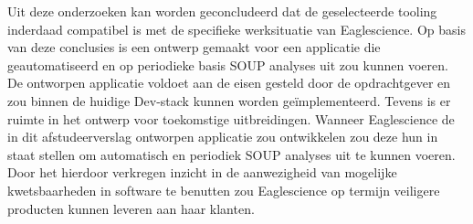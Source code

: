 Uit deze onderzoeken kan worden geconcludeerd dat de geselecteerde tooling inderdaad compatibel is met de specifieke werksituatie van Eaglescience. Op basis van deze conclusies is een ontwerp gemaakt voor een applicatie die geautomatiseerd en op periodieke basis SOUP analyses uit zou kunnen voeren. De ontworpen applicatie voldoet aan de eisen gesteld door de opdrachtgever en zou binnen de huidige Dev-stack kunnen worden geïmplementeerd. Tevens is er ruimte in het ontwerp voor toekomstige uitbreidingen. Wanneer Eaglescience de in dit afstudeerverslag ontworpen applicatie zou ontwikkelen zou deze hun in staat stellen om automatisch en periodiek SOUP analyses uit te kunnen voeren. Door het hierdoor verkregen inzicht in de aanwezigheid van mogelijke kwetsbaarheden in software te benutten zou Eaglescience op termijn veiligere producten kunnen leveren aan haar klanten.

